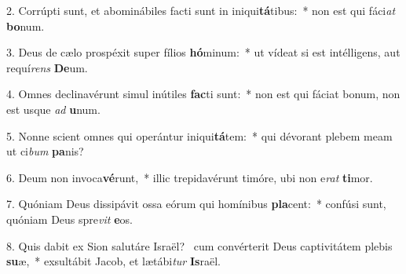 2. Corrúpti sunt, et abominábiles facti sunt in iniqui\textbf{tá}tibus:~*  non est qui fáci\textit{at} \textbf{bo}num.\

3. Deus de cælo prospéxit super fílios \textbf{hó}minum:~*  ut vídeat si est intélligens, aut requí\textit{rens} \textbf{De}um.\

4. Omnes declinavérunt simul inútiles \textbf{fac}ti sunt:~*  non est qui fáciat bonum, non est usque \textit{ad} \textbf{u}num.\

5. Nonne scient omnes qui operántur iniqui\textbf{tá}tem:~*  qui dévorant plebem meam ut ci\textit{bum} \textbf{pa}nis?\

6. Deum non invoca\textbf{vé}runt,~*  illic trepidavérunt timóre, ubi non e\textit{rat} \textbf{ti}mor.\

7. Quóniam Deus dissipávit ossa eórum qui homínibus \textbf{pla}cent:~*  confúsi sunt, quóniam Deus spre\textit{vit} \textbf{e}os.\

8. Quis dabit ex Sion salutáre Israël? \dag\  cum convérterit Deus captivitátem plebis \textbf{su}æ,~*  exsultábit Jacob, et lætábi\textit{tur} \textbf{Is}raël.\

